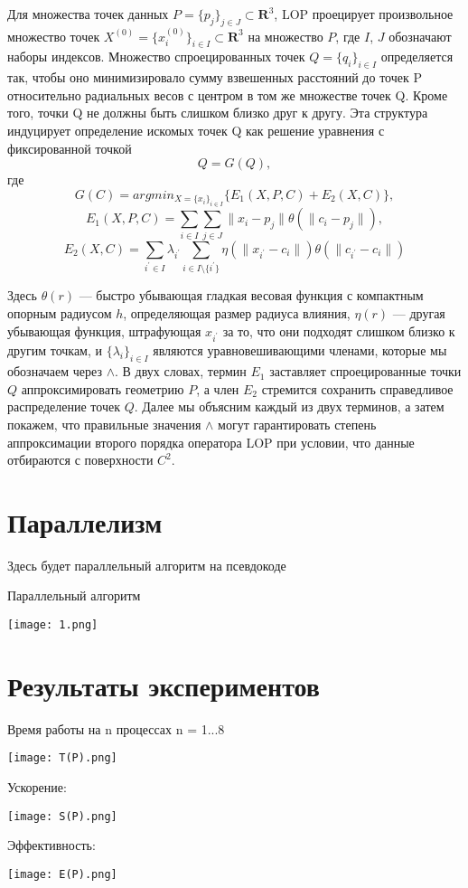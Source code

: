 Для множества точек данных $P = \{p_j\}_{j\in J} \subset \mathbf R^{3}$, LOP проецирует произвольное множество точек $X^{(0)} = \{x_i^{(0)} \} _{i \in I} \subset \mathbf R^{3}$ на множество $P$, где $I$, $J$ обозначают наборы индексов. Множество спроецированных точек $Q = \{q_i\}_{i\in I}$ определяется так, чтобы оно минимизировало сумму взвешенных расстояний до точек P относительно радиальных весов с центром в том же множестве точек Q. Кроме того, точки Q не должны быть слишком близко друг к другу. Эта структура индуцирует определение искомых точек Q как решение уравнения с фиксированной точкой 
$$Q = G(Q),$$
где
$$G(C) = argmin_{X = \{x_i\}_{i \in I}} \{E_1(X,P,C) + E_2(X,C)\},$$
$$E_1(X,P,C) = \sum_{i \in I} \sum_{j \in J}\parallel x_i - p_j \parallel \theta(\parallel c_i - p_j \parallel), $$ 
$$E_2(X, C) = \sum _{i^{'} \in I} \lambda_{i^{'}}\sum_{i \in I \setminus\{i^{'}\}} \eta(\parallel x_{i^{'}}- c_i  \parallel)\theta(\parallel c_{i^{'}} - c_i \parallel)$$

Здесь $\theta(r)$ — быстро убывающая гладкая весовая функция с компактным опорным радиусом $h$, определяющая размер радиуса влияния, $\eta(r)$ — другая убывающая функция, штрафующая $x_{i^{'}}$ за то, что они подходят слишком близко к другим точкам, и $\{\lambda_i\}_{i \in I}$ являются уравновешивающими членами, которые мы обозначаем через $\mathbf \land$. В двух словах, термин $E_1$ заставляет спроецированные точки $Q$ аппроксимировать геометрию $P$, а член $E_2$ стремится  сохранить справедливое распределение точек $Q$. Далее мы объясним каждый из двух терминов, а затем покажем, что правильные значения $\mathbf\land$ могут гарантировать степень аппроксимации второго порядка оператора LOP при условии, что данные отбираются с поверхности $C^{2}$.


\section{Параллелизм}

Здесь будет параллельный алгоритм на псевдокоде




Параллельный алгоритм

\texttt{[image: 1.png]}

\section{Результаты экспериментов}

Время работы на n процессах n = 1...8


\texttt{[image: T(P).png]}

Ускорение:

\texttt{[image: S(P).png]}

Эффективность:

\texttt{[image: E(P).png]}


